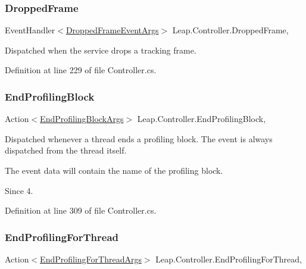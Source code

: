\subsubsection{\texorpdfstring{DroppedFrame}{DroppedFrame}}
{\footnotesize\ttfamily Event\+Handler$<$\mbox{\hyperlink{class_leap_1_1_dropped_frame_event_args}{Dropped\+Frame\+Event\+Args}}$>$ Leap.\+Controller.\+Dropped\+Frame\hspace{0.3cm}{\ttfamily [add]}, {\ttfamily [remove]}}



Dispatched when the service drops a tracking frame. 



Definition at line 229 of file Controller.\+cs.

\mbox{\label{class_leap_1_1_controller_a47514a57487eb7543323ef7ca8f197e3}} 
\subsubsection{\texorpdfstring{EndProfilingBlock}{EndProfilingBlock}}
{\footnotesize\ttfamily Action$<$\mbox{\hyperlink{struct_leap_1_1_end_profiling_block_args}{End\+Profiling\+Block\+Args}}$>$ Leap.\+Controller.\+End\+Profiling\+Block\hspace{0.3cm}{\ttfamily [add]}, {\ttfamily [remove]}}



Dispatched whenever a thread ends a profiling block. The event is always dispatched from the thread itself. 

The event data will contain the name of the profiling block.

\begin{DoxySince}{Since}
4. 
\end{DoxySince}


Definition at line 309 of file Controller.\+cs.

\mbox{\label{class_leap_1_1_controller_a29354296ef9a6de70e2ce06db251c16b}} 
\subsubsection{\texorpdfstring{EndProfilingForThread}{EndProfilingForThread}}
{\footnotesize\ttfamily Action$<$\mbox{\hyperlink{struct_leap_1_1_end_profiling_for_thread_args}{End\+Profiling\+For\+Thread\+Args}}$>$ Leap.\+Controller.\+End\+Profiling\+For\+Thread\hspace{0.3cm}{\ttfamily [add]}, {\ttfamily [remove]}}



